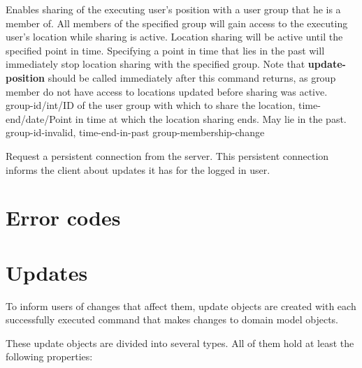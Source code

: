\documentclass[parskip=full,11pt]{scrartcl}
\begin{document}
{Enables sharing of the executing user's position with a user group that he is
a member of.
All members of the specified group will gain access to the executing user's
location while sharing is active.
Location sharing will be active until the specified point in time.
Specifying a point in time that lies in the past will immediately stop location
sharing with the specified group.
Note that \textbf{update-position} should be called immediately after this
command returns, as group member do not have access to locations updated before
sharing was active.
}
{group-id/int/ID of the user group with which to share the location,
time-end/date/Point in time at which the location sharing ends.
May lie in the past.}
{}
{group-id-invalid, time-end-in-past}
{group-membership-change}

{Request a persistent connection from the server. This persistent connection
informs the client about updates it has for the logged in user.}
{}
{}
{}
{}


\section{Error codes}\label{sec:errorcodes}
\apiErrorTable

\section{Updates}
To inform users of changes that affect them, update objects are created with
each successfully executed command that makes changes to domain model objects.

These update objects are divided into several types. All of them hold at least
the following properties:




\end{document}

